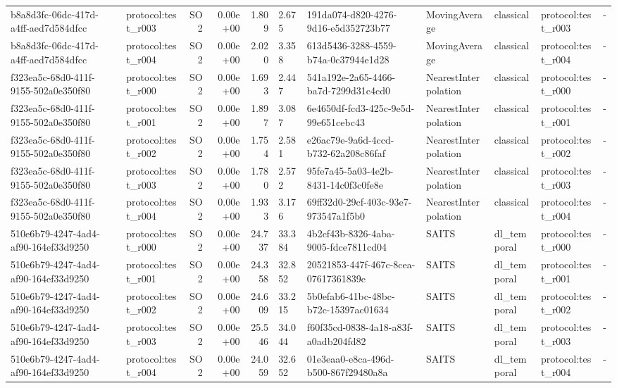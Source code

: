 \begin{table}[htbp]
\begin{tabular}{llrrr}
b8a8d3fc-06dc-417d-a4ff-aed7d584dfcc & protocol:test\_r003 & SO2 & 0.00e+00 & 1.809 & 2.675 & 191da074-d820-4276-9d16-e5d352723b77 & MovingAverage & classical & protocol:test\_r003 & - \\
b8a8d3fc-06dc-417d-a4ff-aed7d584dfcc & protocol:test\_r004 & SO2 & 0.00e+00 & 2.020 & 3.358 & 613d5436-3288-4559-b74a-0c37944e1d28 & MovingAverage & classical & protocol:test\_r004 & - \\
f323ea5c-68d0-411f-9155-502a0e350f80 & protocol:test\_r000 & SO2 & 0.00e+00 & 1.693 & 2.447 & 541a192e-2a65-4466-ba7d-7299d31c4cd0 & NearestInterpolation & classical & protocol:test\_r000 & - \\
f323ea5c-68d0-411f-9155-502a0e350f80 & protocol:test\_r001 & SO2 & 0.00e+00 & 1.897 & 3.087 & 6e4650df-fcd3-425c-9e5d-99e651cebc43 & NearestInterpolation & classical & protocol:test\_r001 & - \\
f323ea5c-68d0-411f-9155-502a0e350f80 & protocol:test\_r002 & SO2 & 0.00e+00 & 1.754 & 2.581 & e26ac79e-9a6d-4ccd-b732-62a208c86faf & NearestInterpolation & classical & protocol:test\_r002 & - \\
f323ea5c-68d0-411f-9155-502a0e350f80 & protocol:test\_r003 & SO2 & 0.00e+00 & 1.780 & 2.572 & 95fe7a45-5a03-4e2b-8431-14c0f3c0fe8e & NearestInterpolation & classical & protocol:test\_r003 & - \\
f323ea5c-68d0-411f-9155-502a0e350f80 & protocol:test\_r004 & SO2 & 0.00e+00 & 1.933 & 3.176 & 69ff32d0-29cf-403c-93e7-973547a1f5b0 & NearestInterpolation & classical & protocol:test\_r004 & - \\
510e6b79-4247-4ad4-af90-164ef33d9250 & protocol:test\_r000 & SO2 & 0.00e+00 & 24.737 & 33.384 & 4b2cf43b-8326-4aba-9005-fdce7811cd04 & SAITS & dl\_temporal & protocol:test\_r000 & - \\
510e6b79-4247-4ad4-af90-164ef33d9250 & protocol:test\_r001 & SO2 & 0.00e+00 & 24.358 & 32.852 & 20521853-447f-467c-8cea-07617361839e & SAITS & dl\_temporal & protocol:test\_r001 & - \\
510e6b79-4247-4ad4-af90-164ef33d9250 & protocol:test\_r002 & SO2 & 0.00e+00 & 24.609 & 33.215 & 5b0efab6-41bc-48bc-b72c-15397ac01634 & SAITS & dl\_temporal & protocol:test\_r002 & - \\
510e6b79-4247-4ad4-af90-164ef33d9250 & protocol:test\_r003 & SO2 & 0.00e+00 & 25.546 & 34.044 & f60f35cd-0838-4a18-a83f-a0adb204fd82 & SAITS & dl\_temporal & protocol:test\_r003 & - \\
510e6b79-4247-4ad4-af90-164ef33d9250 & protocol:test\_r004 & SO2 & 0.00e+00 & 24.059 & 32.652 & 01e3eaa0-e8ca-496d-b500-867f29480a8a & SAITS & dl\_temporal & protocol:test\_r004 & - \\

\end{tabular}
\end{table}
